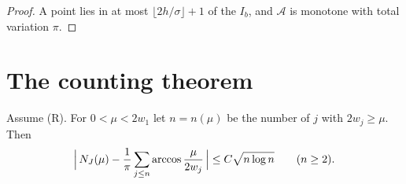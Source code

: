 \begin{proof}
A point lies in at most $\lfloor2h/\sigma\rfloor+1$ of the $I_b$, and $\mathcal A$ is monotone with total variation $\pi$.
\end{proof}

\section{The counting theorem}

\begin{theorem}\label{l:thm:count}
Assume (R). For $0<\mu<2w_1$ let $n=n(\mu)$ be the number of $j$ with $2w_j\ge\mu$. Then
\[
\Bigl|\,N_J(\mu)-\frac1\pi\sum_{j\le n}\arccos\frac{\mu}{2w_j}\,\Bigr|\le C\sqrt{n\log n}\qquad(n\ge2).
\]
\end{theorem}

